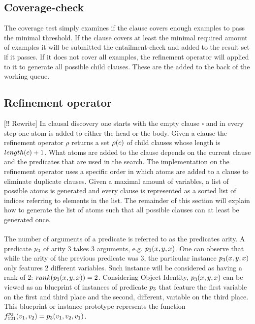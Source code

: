 \subsection{Coverage-check}
The coverage test simply examines if the clause covers enough examples to pass the minimal threshold. If the clause covers at least the minimal required amount of examples it will be submitted the entailment-check and added to the result set if it passes. If it does not cover all examples, the refinement operator will applied to it to generate all possible child clauses. These are the added to the back of the working queue.

\subsection{Refinement operator}
[!! Rewrite]
In clausal discovery one starts with the empty clause $\square$ and in every step one atom is added to either the head or the body. Given a clause  the refinement operator $\rho$ returns a set $\rho(c)$ of child clauses whose length is $length(c) + 1$. What atoms are added to the clause depends on the current clause and the predicates that are used in the search. The implementation on the refinement operator uses a specific order in which atoms are added to a clause to eliminate duplicate clauses. Given a maximal amount of variables, a list of possible atoms is generated and every clause is represented as a sorted list of indices referring to elements in the list. The remainder of this section will explain how to generate the list of atoms such that all possible clauses can at least be generated once.
\\\\
The number of arguments of a predicate is referred to as the predicates arity. A predicate $p_3$ of arity 3 takes 3 arguments, e.g. $p_3(x, y, x)$. One can observe that while the arity of the previous predicate was 3, the particular instance $p_3(x, y, x)$ only features 2 different variables. Such instance will be considered as having a rank of 2: $rank(p_3(x, y, x)) = 2$. Considering Object Identity, $p_3(x, y, x)$ can be viewed as an blueprint of instances of predicate $p_3$ that feature the first variable on the first and third place and the second, different, variable on the third place. This blueprint or instance prototype represents the function $f^{p_3}_{121}(v_1, v_2) = p_3(v_1, v_2, v_1)$.
\\\\

